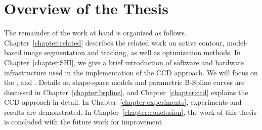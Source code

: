 

\section{Overview of the Thesis}
\label{sec:overview}
The remainder of the work at hand is organized as
follows. Chapter~\ref{chapter:related} describes the related work on
active contour, model-based image segmentation and tracking, as well
as optimization methods. In Chapter~\ref{chapter:SHI}, we give a brief introduction of software
and hardware infrastructure used in the implementation of the CCD
approach. We will focus on the ,  and . Details on shape-space models and parametric
B-Spline curves are discussed in Chapter~\ref{chapter:bspline}, and
Chapter~\ref{chapter:ccd} explains the CCD approach in detail. 
In Chapter~\ref{chapter:experiments}, experiments and results are
demonstrated. In Chapter~\ref{chapter:conclusion}, the work of this
thesis is concluded with the future work for improvement.


